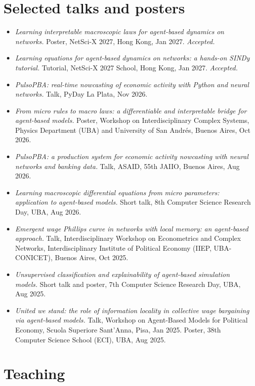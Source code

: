 \documentclass[10pt]{article}
\newcommand{\status}[1]{{\color{accent}\itshape #1}}
\begin{document}
\section{Selected talks and posters}

\begin{itemize}
  \item \emph{Learning interpretable macroscopic laws for agent-based dynamics on networks.} Poster, NetSci-X 2027, Hong Kong, Jan 2027. \status{Accepted.}
  \item \emph{Learning equations for agent-based dynamics on networks: a hands-on SINDy tutorial.} Tutorial, NetSci-X 2027 School, Hong Kong, Jan 2027. \status{Accepted.}
  \item \emph{PulsoPBA: real-time nowcasting of economic activity with Python and neural networks.} Talk, PyDay La Plata, Nov 2026.
  \item \emph{From micro rules to macro laws: a differentiable and interpretable bridge for agent-based models.} Poster, Workshop on Interdisciplinary Complex Systems, Physics Department (UBA) and University of San Andrés, Buenos Aires, Oct 2026.
  \item \emph{PulsoPBA: a production system for economic activity nowcasting with neural networks and banking data.} Talk, ASAID, 55th JAIIO, Buenos Aires, Aug 2026.
  \item \emph{Learning macroscopic differential equations from micro parameters: application to agent-based models.} Short talk, 8th Computer Science Research Day, UBA, Aug 2026.
  \item \emph{Emergent wage Phillips curve in networks with local memory: an agent-based approach.} Talk, Interdisciplinary Workshop on Econometrics and Complex Networks, Interdisciplinary Institute of Political Economy (IIEP, UBA-CONICET), Buenos Aires, Oct 2025.
  \item \emph{Unsupervised classification and explainability of agent-based simulation models.} Short talk and poster, 7th Computer Science Research Day, UBA, Aug 2025.
  \item \emph{United we stand: the role of information locality in collective wage bargaining via agent-based models.} Talk, Workshop on Agent-Based Models for Political Economy, Scuola Superiore Sant'Anna, Pisa, Jan 2025. Poster, 38th Computer Science School (ECI), UBA, Aug 2025.
\end{itemize}

\section{Teaching}
\end{document}
